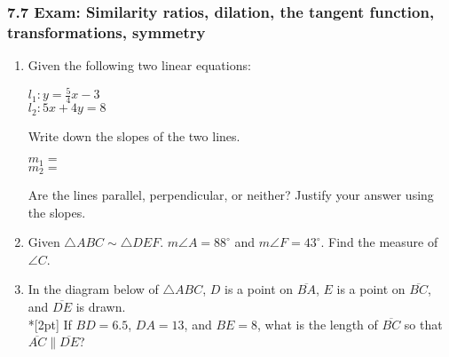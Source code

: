 \documentclass[12pt, twoside]{article}
\begin{document}
\subsubsection*{7.7 Exam: Similarity ratios, dilation, the tangent function, transformations, symmetry}
  \begin{enumerate}

  \item Given the following two linear equations:
    \begin{multicols}{2}
      $l_1: y =\frac{5}{4}x-3$ \\
      $l_2: 5x+4y=8$
    \end{multicols}     \vspace{1cm}
    Write down the slopes of the two lines.
    \begin{multicols}{2}
      $m_1=$ \\
      $m_2=$
    \end{multicols}     \vspace{0.1cm}
    Are the lines parallel, perpendicular, or neither? Justify your answer using the slopes.
    \vspace{2cm}

  \item Given $\triangle ABC \sim \triangle DEF$. $m\angle A = 88^\circ$ and $m\angle F = 43^\circ$. Find the measure of $\angle C$. \vspace{2cm}
  
  \item In the diagram below of $\triangle ABC$, $D$ is a point on $\overline{BA}$, $E$ is a point on $\overline{BC}$, and $\overline{DE}$ is drawn. \\*[2pt] 
    If $BD=6.5$, $DA=13$, and $BE=8$, what is the length of $\overline{BC}$ so that $\overline{AC} \parallel \overline{DE}$?
    \begin{flushright}
      \end{flushright}


\end{enumerate}
\end{document}
